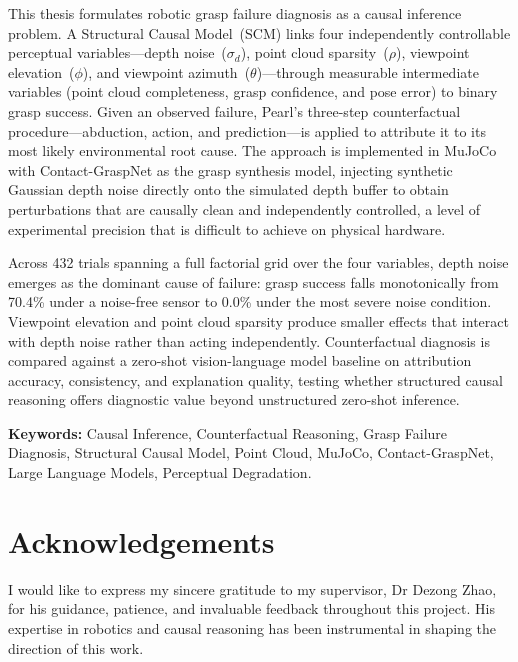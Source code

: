 \documentclass[11pt,a4paper]{report}
\begin{document}
This thesis formulates robotic grasp failure diagnosis as a causal inference problem. A Structural Causal Model~(SCM) links four independently controllable perceptual variables---depth noise~($\sigma_d$), point cloud sparsity~($\rho$), viewpoint elevation~($\phi$), and viewpoint azimuth~($\theta$)---through measurable intermediate variables (point cloud completeness, grasp confidence, and pose error) to binary grasp success. Given an observed failure, Pearl's three-step counterfactual procedure---abduction, action, and prediction---is applied to attribute it to its most likely environmental root cause. The approach is implemented in MuJoCo with Contact-GraspNet as the grasp synthesis model, injecting synthetic Gaussian depth noise directly onto the simulated depth buffer to obtain perturbations that are causally clean and independently controlled, a level of experimental precision that is difficult to achieve on physical hardware.

Across 432 trials spanning a full factorial grid over the four variables, depth noise emerges as the dominant cause of failure: grasp success falls monotonically from 70.4\% under a noise-free sensor to 0.0\% under the most severe noise condition. Viewpoint elevation and point cloud sparsity produce smaller effects that interact with depth noise rather than acting independently. Counterfactual diagnosis is compared against a zero-shot vision-language model baseline on attribution accuracy, consistency, and explanation quality, testing whether structured causal reasoning offers diagnostic value beyond unstructured zero-shot inference.

\textbf{Keywords:} Causal Inference, Counterfactual Reasoning, Grasp Failure Diagnosis, Structural Causal Model, Point Cloud, MuJoCo, Contact-GraspNet, Large Language Models, Perceptual Degradation.

\chapter*{Acknowledgements}

I would like to express my sincere gratitude to my supervisor, Dr Dezong Zhao, for his guidance, patience, and invaluable feedback throughout this project. His expertise in robotics and causal reasoning has been instrumental in shaping the direction of this work.
\end{document}
